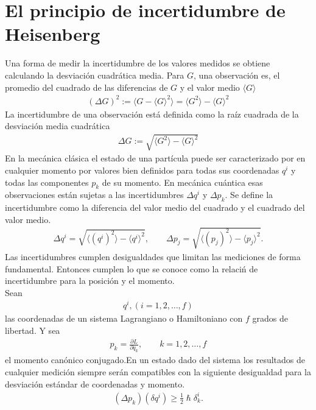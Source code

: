 \documentclass[letterpaper,12pt,oneside]{book}
\begin{document}
\section{El principio de incertidumbre de Heisenberg}
Una forma de medir la incertidumbre de los valores medidos se obtiene calculando la desviaci\'on cuadr\'atica media. Para $G$, una observaci\'on es, el promedio del cuadrado de las diferencias de $G$ y el valor medio $\langle G \rangle$
%
\begin{eqnarray}
(\Delta G)^2 := \langle {G - \langle G \rangle}^2 \rangle = \langle G^2 \rangle - \langle G \rangle^2\label{incer}
\end{eqnarray}
%
La incertidumbre de una observaci\'on est\'a definida como la ra\'iz cuadrada de la desviaci\'on media cuadr\'atica
%
\begin{eqnarray}
\Delta G := \sqrt{\langle G^2 \rangle - \langle G \rangle^2}
\end{eqnarray}
%
En la mec\'anica cl\'asica el estado de una part\'icula puede ser caracterizado por en cualquier momento por valores bien definidos para todas sus coordenadas $q^i$ y todas las componentes $p_k$ de su momento. En mec\'anica cu\'antica esas observaciones est\'an sujetas a las incertidumbres $\Delta q^i$ y $\Delta p_k$. 
Se define la incertidumbre como la diferencia del valor medio del cuadrado y el cuadrado del valor medio.
%
\begin{eqnarray}
\Delta q^i = \sqrt{\langle (q^i)^2\rangle - \langle q^i\rangle^2}, \qquad \Delta p_j = \sqrt{\langle (p_j)^2\rangle - \langle p_j\rangle^2}.
\end{eqnarray}
%
Las incertidumbres cumplen desigualdades que limitan las mediciones de forma fundamental. Entonces cumplen lo que se conoce como la relaci\'n de incertidumbre para la posici\'on y el momento. \\
Sean
%
\begin{eqnarray}
{q^i, (i = 1,2,\dots, f)}
\end{eqnarray}
%
las coordenadas de un sistema Lagrangiano o Hamiltoniano con $f$ grados de libertad. Y sea
%
\begin{eqnarray}
p_k = \frac{\partial L}{\partial \dot q_k}, \qquad k = 1,2,\dots, f
\end{eqnarray}
%
el momento can\'onico conjugado.En un estado dado del sistema los resultados de cualquier medici\'on siempre ser\'an compatibles con la siguiente desigualdad para la desviaci\'on est\'andar de coordenadas y momento. 
%
\begin{eqnarray}
(\Delta p_k)(\delta q^i)\geq \frac{1}{2}\hslash \delta^i_k\label{heise}.
\end{eqnarray}
\end{document}
